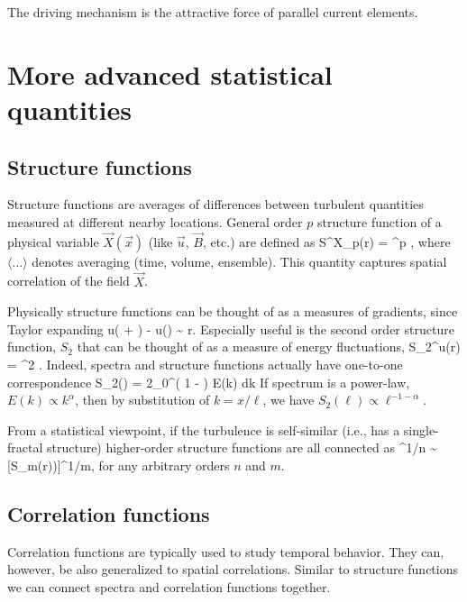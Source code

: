 \documentclass[usenatbib,twocolumn]{aastex63}
\begin{document}
The driving mechanism is the attractive force of parallel current elements.


\section{More advanced statistical quantities}\label{sect:adv_stat}

\subsection{Structure functions}

Structure functions are averages of differences between turbulent quantities measured at different nearby locations.
General order $p$ structure function of a physical variable $\vec{X}(\vec{x})$ (like $\vec{u}$, $\vec{B}$, etc.) are defined as
\be
S^X_p(r) = ^p \rangle,
\ee
where $\langle \ldots \rangle$ denotes averaging (time, volume, ensemble). %
This quantity captures spatial correlation of the field $\vec{X}$.

Physically structure functions can be thought of as a measures of gradients, since Taylor expanding
\be
u( + ) - u() \sim {} r.
\ee
Especially useful is the second order structure function, $S_2$ that can be thought of as a measure of energy fluctuations,
\be
S_2^u(r) = ^2 \rangle.
\ee
Indeed, spectra and structure functions actually have one-to-one correspondence
\be
S_2(\ell) = 2\int_0^\infty \left( 1 - \right) E(k) dk
\ee
If spectrum is a power-law, $E(k) \propto k^\alpha$, then by substitution of $k = x/\ell$, we have $S_2(\ell) \propto \ell^{-1-\alpha}$.

From a statistical viewpoint, if the turbulence is self-similar (i.e., has a single-fractal structure) higher-order structure functions are all connected as 
\be
[S_n(r))]^{1/n} \sim [S_m(r))]^{1/m},
\ee
for any arbitrary orders $n$ and $m$.

\subsection{Correlation functions}

Correlation functions are typically used to study temporal behavior.
They can, however, be also generalized to spatial correlations.
Similar to structure functions we can connect spectra and correlation functions together.
\end{document}
